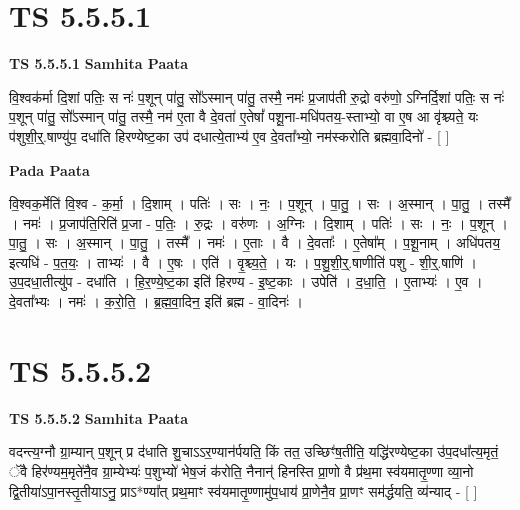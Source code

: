 \documentclass[17pt]{extarticle}
\begin{document}
\section*{ TS 5.5.5.1 }

\textbf{TS 5.5.5.1 } \newline
\textbf{Samhita Paata} \newline

वि॒श्वक॑र्मा दि॒शां पतिः॒ स नः॑ प॒शून् पा॑तु॒ सो᳚ऽस्मान् पा॑तु॒ तस्मै॒ नमः॑ प्र॒जाप॑ती रु॒द्रो वरु॑णो॒ ऽग्निर्दि॒शां पतिः॒ स नः॑ प॒शून् पा॑तु॒ सो᳚ऽस्मान् पा॑तु॒ तस्मै॒ नम॑ ए॒ता वै दे॒वता॑ ए॒तेषां᳚ पशू॒ना-मधि॑पतय॒-स्ताभ्यो॒ वा ए॒ष आ वृ॑श्च्यते॒ यः प॑शुशी॒र्॒.षाण्यु॑प॒ दधा॑ति हिरण्येष्ट॒का उप॑ दधात्ये॒ताभ्य॑ ए॒व दे॒वता᳚भ्यो॒ नम॑स्करोति ब्रह्मवा॒दिनो॑ - [  ] \newline

\textbf{Pada Paata} \newline

वि॒श्वक॒र्मेति॑ वि॒श्व - क॒र्मा॒ । दि॒शाम् । पतिः॑ । सः । नः॒ । प॒शून् । पा॒तु॒ । सः । अ॒स्मान् । पा॒तु॒ । तस्मै᳚ । नमः॑ । प्र॒जाप॑ति॒रिति॑ प्र॒जा - प॒तिः॒ । रु॒द्रः । वरु॑णः । अ॒ग्निः । दि॒शाम् । पतिः॑ । सः । नः॒ । प॒शून् । पा॒तु॒ । सः । अ॒स्मान् । पा॒तु॒ । तस्मै᳚ । नमः॑ । ए॒ताः । वै । दे॒वताः᳚ । ए॒तेषा᳚म् । प॒शू॒नाम् । अधि॑पतय॒ इत्यधि॑ - प॒त॒यः॒ । ताभ्यः॑ । वै । ए॒षः । एति॑ । वृ॒श्च्य॒ते॒ । यः । प॒शु॒शी॒र्॒.षाणीति॑ पशु - शी॒र्॒.षाणि॑ । उ॒प॒दधा॒तीत्यु॑प - दधा॑ति । हि॒र॒ण्ये॒ष्ट॒का इति॑ हिरण्य - इ॒ष्ट॒काः । उपेति॑ । द॒धा॒ति॒ । ए॒ताभ्यः॑ । ए॒व । दे॒वता᳚भ्यः । नमः॑ । क॒रो॒ति॒ । ब्र॒ह्म॒वा॒दिन॒ इति॑ ब्रह्म - वा॒दिनः॑ ।  \newline




\section*{ TS 5.5.5.2 }

\textbf{TS 5.5.5.2 } \newline
\textbf{Samhita Paata} \newline

वदन्त्य॒ग्नौ ग्रा॒म्यान् प॒शून् प्र द॑धाति शु॒चाऽऽर॒ण्यान॑र्पयति॒ किं तत॒ उच्छिꣳ॑ष॒तीति॒ यद्धि॑रण्येष्ट॒का उ॑प॒दधा᳚त्य॒मृतं॒ ॅवै हिर॑ण्यम॒मृते॑नै॒व ग्रा॒म्येभ्यः॑ प॒शुभ्यो॑ भेष॒जं क॑रोति॒ नैनान्॑ हिनस्ति प्रा॒णो वै प्र॑थ॒मा स्व॑यमातृ॒ण्णा व्या॒नो द्वि॒तीया॑ऽपा॒नस्तृ॒तीयाऽनु॒ प्राऽ*ण्या᳚त् प्रथ॒माꣳ स्व॑यमातृ॒ण्णामु॑प॒धाय॑ प्रा॒णेनै॒व प्रा॒णꣳ सम॑र्द्धयति॒ व्य॑न्याद् - [  ] \newline
\end{document}
